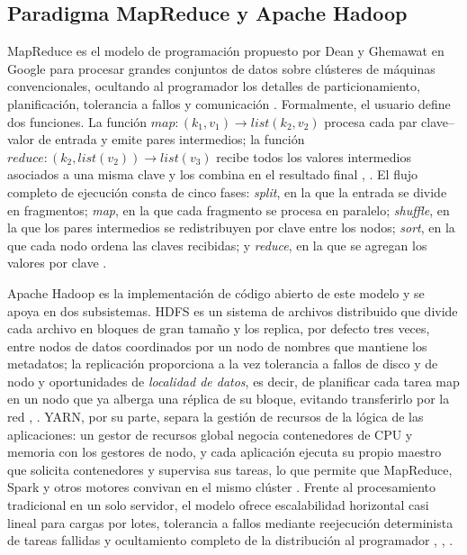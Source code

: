 \documentclass[10pt,journal]{IEEEtran}
\begin{document}
\subsection{Paradigma MapReduce y Apache Hadoop}
\label{sec:mapreduce}
MapReduce es el modelo de programaci\'on propuesto por Dean y Ghemawat en Google
para procesar grandes conjuntos de datos sobre cl\'usteres de m\'aquinas
convencionales, ocultando al programador los detalles de particionamiento,
planificaci\'on, tolerancia a fallos y comunicaci\'on \cite{dean2008}.
Formalmente, el usuario define dos funciones. La funci\'on
$\mathit{map}: (k_1, v_1) \rightarrow \mathit{list}(k_2, v_2)$ procesa cada par
clave--valor de entrada y emite pares intermedios; la funci\'on
$\mathit{reduce}: (k_2, \mathit{list}(v_2)) \rightarrow \mathit{list}(v_3)$
recibe todos los valores intermedios asociados a una misma clave y los combina
en el resultado final \cite{dean2008}, \cite{shvachko2010}. El flujo completo de
ejecuci\'on consta de cinco fases: \emph{split}, en la que la entrada se divide
en fragmentos; \emph{map}, en la que cada fragmento se procesa en paralelo;
\emph{shuffle}, en la que los pares intermedios se redistribuyen por clave entre
los nodos; \emph{sort}, en la que cada nodo ordena las claves recibidas; y
\emph{reduce}, en la que se agregan los valores por clave \cite{dean2008}.

Apache Hadoop es la implementaci\'on de c\'odigo abierto de este modelo y se
apoya en dos subsistemas. HDFS es un sistema de archivos distribuido que divide
cada archivo en bloques de gran tama\~no y los replica, por defecto tres veces,
entre nodos de datos coordinados por un nodo de nombres que mantiene los
metadatos; la replicaci\'on proporciona a la vez tolerancia a fallos de disco y
de nodo y oportunidades de \emph{localidad de datos}, es decir, de planificar
cada tarea map en un nodo que ya alberga una r\'eplica de su bloque, evitando
transferirlo por la red \cite{shvachko2010}, \cite{white2015}. YARN, por su parte, separa la
gesti\'on de recursos de la l\'ogica de las aplicaciones: un gestor de recursos
global negocia contenedores de CPU y memoria con los gestores de nodo, y cada
aplicaci\'on ejecuta su propio maestro que solicita contenedores y supervisa
sus tareas, lo que permite que MapReduce, Spark y otros motores convivan en el
mismo cl\'uster \cite{vavilapalli2013}. Frente al procesamiento tradicional en un
solo servidor, el modelo ofrece escalabilidad horizontal casi lineal para
cargas por lotes, tolerancia a fallos mediante reejecuci\'on determinista de
tareas fallidas y ocultamiento completo de la distribuci\'on al programador
\cite{dean2008}, \cite{white2015}, \cite{shvachko2010}.
\end{document}

